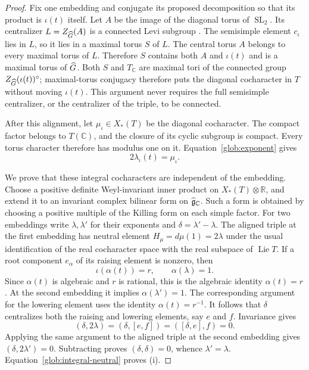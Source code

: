 \begin{proof}
Fix one embedding and conjugate its proposed decomposition so that
its product is $\iota(t)$ itself.  Let $A$ be the image of the diagonal
torus of $\operatorname{SL}_2$.  Its centralizer
$L=Z_{\widehat G}(A)$ is a connected Levi subgroup
\cite[Theorem~17.38 and Section~25.25]{MilneAlgebraicGroups}.
The semisimple element
$c_\iota$ lies in $L$, so it lies in a maximal torus $S$ of $L$.
The central torus $A$ belongs to every maximal torus of $L$.
Therefore $S$ contains both $A$ and $\iota(t)$ and is a maximal torus
of $\widehat G$.  Both $S$ and $T_{\mathbb C}$ are maximal tori of the
connected group $Z_{\widehat G}(\iota(t))^\circ$; maximal-torus conjugacy
\cite[Theorem~17.10]{MilneAlgebraicGroups} therefore puts the diagonal
cocharacter in $T$ without moving $\iota(t)$.
This argument never requires the full semisimple
centralizer, or the centralizer of the triple, to be connected.

After this alignment, let $\mu_\iota\in X_*(T)$ be the diagonal
cocharacter.  The compact factor belongs to $T(\mathbb C)$, and the
closure of its cyclic subgroup is compact.  Every torus character
therefore has modulus one on it.  Equation~\eqref{glob:exponent}
gives
\begin{equation}\label{glob:integral-neutral}
             2\lambda_\iota(t)=\mu_\iota.
\end{equation}

We prove that these integral cocharacters are independent of the
embedding.  Choose a positive definite Weyl-invariant inner product
on $X_*(T)\otimes\mathbb R$, and extend it to an invariant complex
bilinear form on $\widehat{\mathfrak g}_{\mathbb C}$.  Such a form is obtained by
choosing a positive multiple of the Killing form on each simple
factor.  For two embeddings write $\lambda,\lambda'$ for their
exponents and $\delta=\lambda'-\lambda$.  The aligned triple at the
first embedding has neutral element
$H_\mu=d\mu(1)=2\lambda$ under the usual identification of the
real cocharacter space with the real subspace of $\operatorname{Lie}T$.
If a root component $e_\alpha$ of its raising element is nonzero,
then
\[
       \iota(\alpha(t))=r,
       \qquad \alpha(\lambda)=1.
\]
Since $\alpha(t)$ is algebraic and $r$ is rational, this is the
algebraic identity $\alpha(t)=r$.  At the second embedding it implies
$\alpha(\lambda')=1$.  The corresponding argument for the lowering
element uses the identity $\alpha(t)=r^{-1}$.  It follows that
$\delta$ centralizes both the raising and lowering elements, say
$e$ and $f$.  Invariance gives
\[
        (\delta,2\lambda)
        =(\delta,[e,f])=([\delta,e],f)=0.
\]
Applying the same argument to the aligned triple at the second
embedding gives $(\delta,2\lambda')=0$.  Subtracting proves
$(\delta,\delta)=0$, whence $\lambda'=\lambda$.
Equation~\eqref{glob:integral-neutral} proves \textup{(i)}.


\end{proof}
